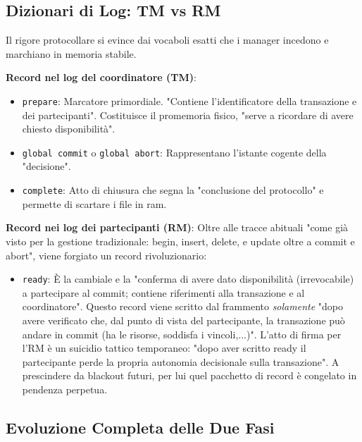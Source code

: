 \subsection{Dizionari di Log: TM vs RM}
Il rigore protocollare si evince dai vocaboli esatti che i manager incedono e marchiano in memoria stabile.

\textbf{Record nel log del coordinatore (TM)}:
\begin{itemize}
    \item \texttt{prepare}: Marcatore primordiale. "Contiene l'identificatore della transazione e dei partecipanti". Costituisce il promemoria fisico, "serve a ricordare di avere chiesto disponibilità".
    \item \texttt{global commit} o \texttt{global abort}: Rappresentano l'istante cogente della "decisione".
    \item \texttt{complete}: Atto di chiusura che segna la "conclusione del protocollo" e permette di scartare i file in ram.
\end{itemize}

\textbf{Record nei log dei partecipanti (RM)}:
Oltre alle tracce abituali "come già visto per la gestione tradizionale: begin, insert, delete, e update oltre a commit e abort", viene forgiato un record rivoluzionario:
\begin{itemize}
    \item \texttt{ready}: È la cambiale e la "conferma di avere dato disponibilità (irrevocabile) a partecipare al commit; contiene riferimenti alla transazione e al coordinatore". Questo record viene scritto dal frammento \textit{solamente} "dopo avere verificato che, dal punto di vista del partecipante, la transazione può andare in commit (ha le risorse, soddisfa i vincoli,...)".
    L'atto di firma per l'RM è un suicidio tattico temporaneo: "dopo aver scritto ready il partecipante perde la propria autonomia decisionale sulla transazione". A prescindere da blackout futuri, per lui quel pacchetto di record è congelato in pendenza perpetua.
\end{itemize}

\subsection{Evoluzione Completa delle Due Fasi}

